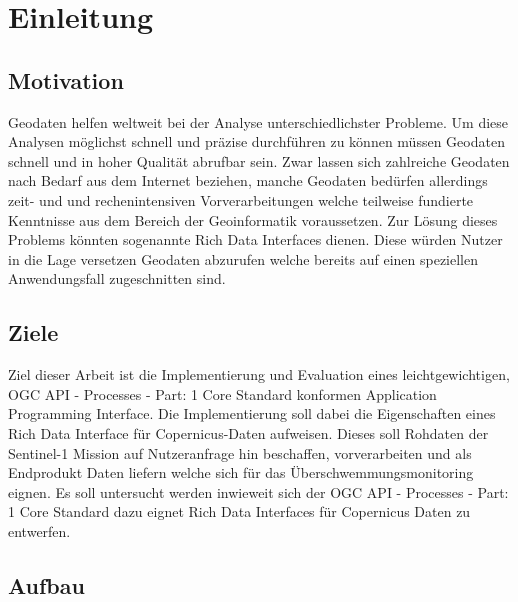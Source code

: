 \newpage
\restoregeometry
\section{Einleitung}
\subsection{Motivation}
Geodaten helfen weltweit bei der Analyse unterschiedlichster Probleme. Um diese Analysen möglichst schnell und präzise durchführen zu 
können müssen Geodaten schnell und in hoher Qualität abrufbar sein. Zwar lassen sich zahlreiche Geodaten nach Bedarf aus dem Internet beziehen, 
manche Geodaten bedürfen allerdings zeit- und und rechenintensiven Vorverarbeitungen welche teilweise fundierte Kenntnisse aus dem Bereich der 
Geoinformatik voraussetzen. Zur Lösung dieses Problems könnten sogenannte Rich Data Interfaces dienen. Diese würden Nutzer in die Lage versetzen 
Geodaten abzurufen welche bereits auf einen speziellen Anwendungsfall zugeschnitten sind. 
\subsection{Ziele}
Ziel dieser Arbeit ist die Implementierung und Evaluation eines leichtgewichtigen, OGC API - Processes - Part: 1 Core Standard konformen Application Programming Interface. 
Die Implementierung soll dabei die Eigenschaften eines Rich Data Interface für Copernicus-Daten aufweisen. Dieses soll Rohdaten der Sentinel-1 Mission 
auf Nutzeranfrage hin beschaffen, vorverarbeiten und als Endprodukt Daten liefern welche sich für das Überschwemmungsmonitoring eignen. 
Es soll untersucht werden inwieweit sich der OGC API - Processes - Part: 1 Core Standard dazu eignet Rich Data Interfaces für Copernicus Daten zu entwerfen. 
\subsection{Aufbau}



